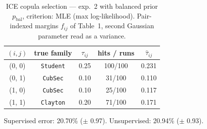 \begin{table}[htbp]
  \centering
  \caption{ICE copula selection — exp.\ 2 with balanced prior $p_{\text{bal}}$, criterion: MLE (max log-likelihood). Pair-indexed margins $f_{ij}$ of Table~1, second Gaussian parameter read as a variance.}
  \label{tab:exp3-exp2_bal_p__mle}
  \begin{tabular}{ccccc}
    \toprule
    $(i, j)$ & true family & $\tau_{ij}$ & hits / runs & $\hat\tau_{ij}$ \\
    \midrule
    (0, 0) & \texttt{Student} & 0.25 & 100/100 & 0.231 \\
    (0, 1) & \texttt{CubSec} & 0.10 & 31/100 & 0.110 \\
    (1, 0) & \texttt{CubSec} & 0.10 & 25/100 & 0.117 \\
    (1, 1) & \texttt{Clayton} & 0.20 & 71/100 & 0.171 \\
    \bottomrule
  \end{tabular}
  \par\smallskip Supervised error: 20.70\% ($\pm$ 0.97). Unsupervised: 20.94\% ($\pm$ 0.93).
\end{table}
